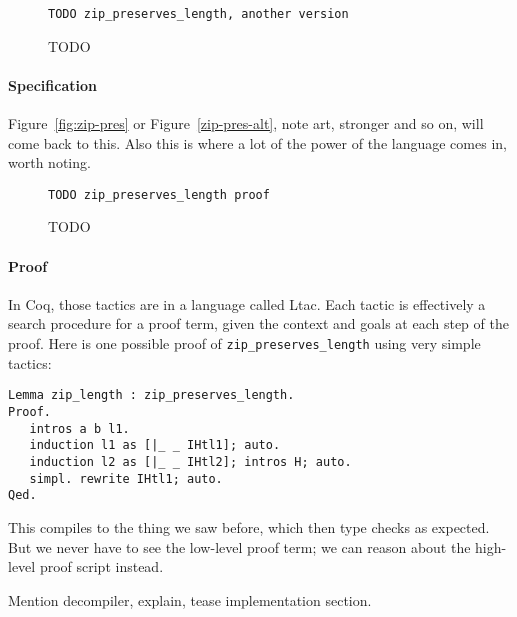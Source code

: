 \begin{figure}
\begin{lstlisting}
TODO zip_preserves_length, another version
\end{lstlisting}
\caption{TODO}
\label{fig:zip-pres-alt}
\end{figure}

\paragraph{Specification} Figure~\ref{fig:zip-pres} or Figure~\ref{zip-pres-alt}, note art, stronger and so on, will come back to this.
Also this is where a lot of the power of the language comes in, worth noting.

\begin{figure}
\begin{lstlisting}
TODO zip_preserves_length proof
\end{lstlisting}
\caption{TODO}
\label{fig:zip-pres-proof}
\end{figure}

\paragraph{Proof} 
In Coq, those tactics are in a language called Ltac.
Each tactic is effectively a search procedure for a proof term, given the context and goals at each step of the proof.
Here is one possible proof of \lstinline{zip_preserves_length} using very simple tactics:
\begin{lstlisting}
Lemma zip_length : zip_preserves_length.
Proof.
   intros a b l1.
   induction l1 as [|_ _ IHtl1]; auto.
   induction l2 as [|_ _ IHtl2]; intros H; auto.
   simpl. rewrite IHtl1; auto.
Qed.
\end{lstlisting}
This compiles to the thing we saw before, which then type checks as expected.
But we never have to see the low-level proof term; we can reason about the high-level proof script instead.

Mention decompiler, explain, tease implementation section.




